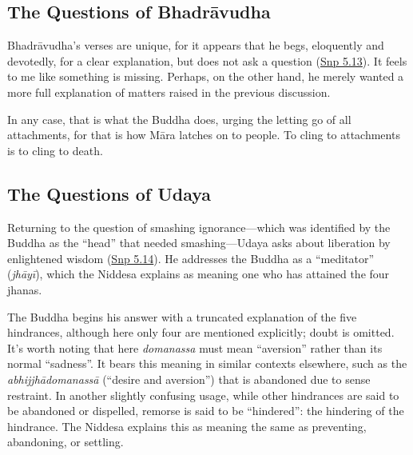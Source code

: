 \documentclass[12pt,openany]{book}%
\begin{document}
\subsection*{The Questions of \textsanskrit{Bhadrāvudha}}

\textsanskrit{Bhadrāvudha}’s verses are unique, for it appears that he begs, eloquently and devotedly, for a clear explanation, but does not ask a question (\href{https://suttacentral.net/snp5.13/en/sujato}{Snp 5.13}). It feels to me like something is missing. Perhaps, on the other hand, he merely wanted a more full explanation of matters raised in the previous discussion.

In any case, that is what the Buddha does, urging the letting go of all attachments, for that is how \textsanskrit{Māra} latches on to people. To cling to attachments is to cling to death.

\subsection*{The Questions of Udaya}

Returning to the question of smashing ignorance—which was identified by the Buddha as the “head” that needed smashing—Udaya asks about liberation by enlightened wisdom (\href{https://suttacentral.net/snp5.14/en/sujato}{Snp 5.14}). He addresses the Buddha as a “meditator” (\textit{\textsanskrit{jhāyī}}), which the Niddesa explains as meaning one who has attained the four jhanas.

The Buddha begins his answer with a truncated explanation of the five hindrances, although here only four are mentioned explicitly; doubt is omitted. It’s worth noting that here \textit{domanassa} must mean “aversion” rather than its normal “sadness”. It bears this meaning in similar contexts elsewhere, such as the \textit{\textsanskrit{abhijjhādomanassā}} (“desire and aversion”) that is abandoned due to sense restraint. In another slightly confusing usage, while other hindrances are said to be abandoned or dispelled, remorse is said to be “hindered”: the hindering of the hindrance. The Niddesa explains this as meaning the same as preventing, abandoning, or settling.
\end{document}
